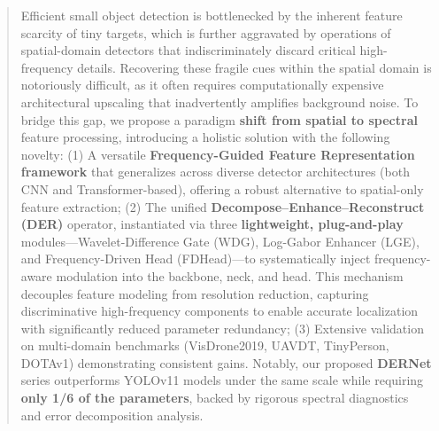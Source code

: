 \documentclass{article}
\theoremstyle{plain}
\theoremstyle{definition}
\theoremstyle{remark}
\begin{document}

\printAffiliationsAndNotice{\icmlEqualContribution}  %



\begin{abstract}

Efficient small object detection is bottlenecked by the inherent feature scarcity of tiny targets, which is further aggravated by operations of spatial-domain detectors that indiscriminately discard critical high-frequency details. 
Recovering these fragile cues within the spatial domain is notoriously difficult, as it often requires computationally expensive architectural upscaling that inadvertently amplifies background noise. 
To bridge this gap, we propose a paradigm \textbf{shift from spatial to spectral} feature processing, introducing a holistic solution with the following novelty: 
(1) A versatile \textbf{Frequency-Guided Feature Representation framework} that generalizes across diverse detector architectures (both CNN and Transformer-based), offering a robust alternative to spatial-only feature extraction; (2) The unified \textbf{Decompose--Enhance--Reconstruct (DER)} operator, instantiated via three \textbf{lightweight, plug-and-play} modules---Wavelet-Difference Gate (WDG), Log-Gabor Enhancer (LGE), and Frequency-Driven Head (FDHead)---to systematically inject frequency-aware modulation into the backbone, neck, and head. This mechanism decouples feature modeling from resolution reduction, capturing discriminative high-frequency components to enable accurate localization with significantly reduced parameter redundancy; (3) Extensive validation on multi-domain benchmarks (VisDrone2019, UAVDT, TinyPerson, DOTAv1) demonstrating consistent gains. Notably, our proposed \textbf{DERNet} series outperforms YOLOv11 models under the same scale while requiring \textbf{only 1/6 of the parameters}, backed by rigorous spectral diagnostics and error decomposition analysis.

\end{abstract}
\end{document}
